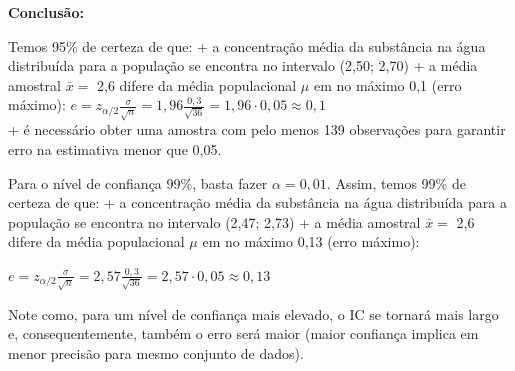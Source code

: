 \documentclass[
]{book}
\newenvironment{Shaded}{\begin{snugshade}}{\end{snugshade}}
\newcommand{\CommentTok}[1]{\textcolor[rgb]{0.56,0.35,0.01}{\textit{#1}}}
\newcommand{\DecValTok}[1]{\textcolor[rgb]{0.00,0.00,0.81}{#1}}
\newcommand{\FloatTok}[1]{\textcolor[rgb]{0.00,0.00,0.81}{#1}}
\newcommand{\KeywordTok}[1]{\textcolor[rgb]{0.13,0.29,0.53}{\textbf{#1}}}
\newcommand{\NormalTok}[1]{#1}
\newcommand{\OperatorTok}[1]{\textcolor[rgb]{0.81,0.36,0.00}{\textbf{#1}}}
\newcommand{\StringTok}[1]{\textcolor[rgb]{0.31,0.60,0.02}{#1}}
\theoremstyle{definition}
\theoremstyle{definition}
\theoremstyle{definition}
\theoremstyle{remark}
\begin{document}
\begin{Shaded}
\end{Shaded}

\textbf{Conclusão:}

Temos 95\% de certeza de que:
+ a concentração média da substância na água distribuída para a população se encontra no intervalo (2,50; 2,70)
+ a média amostral \(\bar{x} =\) 2,6 difere da média populacional \(\mu\) em no máximo 0,1 (erro máximo): \(e = z_{\alpha/2}\frac{\sigma}{\sqrt{n}} = 1,96 \frac{0,3}{\sqrt{36}} = 1,96 \cdot 0,05 \approx 0,1\)\\
+ é necessário obter uma amostra com pelo menos 139 observações para garantir erro na estimativa menor que 0,05.

Para o nível de confiança 99\%, basta fazer \(\alpha = 0,01\). Assim, temos 99\% de certeza de que:
+ a concentração média da substância na água distribuída para a população se encontra no intervalo (2,47; 2,73)
+ a média amostral \(\bar{x} =\) 2,6 difere da média populacional \(\mu\) em no máximo 0,13 (erro máximo):

\(e = z_{\alpha/2}\frac{\sigma}{\sqrt{n}} = 2,57 \frac{0,3}{\sqrt{36}} = 2,57 \cdot 0,05 \approx 0,13\)

Note como, para um nível de confiança mais elevado, o IC se tornará mais largo e, consequentemente, também o erro será maior (maior confiança implica em menor precisão para mesmo conjunto de dados).
\end{document}
